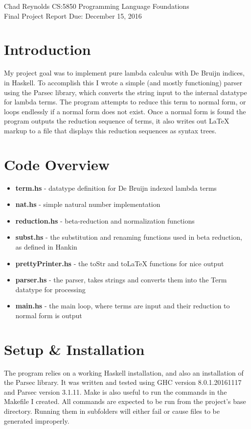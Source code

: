 \documentclass[12pt,oneside]{article}
\begin{document}
Chad Reynolds \hfill 
CS:5850 Programming Language Foundations \\ 
Final Project Report \hfill 
Due:  December 15, 2016 \\


\section*{Introduction} 
My project goal was to implement pure lambda calculus with De Bruijn indices, 
in Haskell.  To accomplish this I wrote a simple (and mostly functioning) 
parser using the Parsec library, which converts the string input to the 
internal datatype for lambda terms.  The program attempts to reduce this 
term to normal form, or loops endlessly if a normal form does not exist.  
Once a normal form is found the program outputs the reduction sequence of terms, 
it also writes out \LaTeX{} markup to a file that displays 
this reduction sequences as syntax trees.

\section*{Code Overview}
\begin{itemize}
\item \textbf{term.hs} - 
    datatype definition for De Bruijn indexed lambda terms
\item \textbf{nat.hs} - 
    simple natural number implementation
\item \textbf{reduction.hs} - 
    beta-reduction and normalization functions
\item \textbf{subst.hs} - 
    the substitution and renaming functions used in beta reduction, as 
    defined in Hankin \cite{hankin2004introduction}
\item \textbf{prettyPrinter.hs} - 
    the toStr and toLaTeX functions for nice output
\item \textbf{parser.hs} - 
    the parser, takes strings and converts them into the Term datatype for processing
\item \textbf{main.hs} - 
    the main loop, where terms are input and their reduction to normal form 
    is output
\end{itemize}

\section*{Setup \& Installation} 
The program relies on a working Haskell installation, and also an 
installation of the Parsec library.  It was written and tested using 
GHC version 8.0.1.20161117 and Parsec version 3.1.11.  Make is also useful 
to run the commands in the Makefile I created.  All commands are expected to 
be run from the project's base directory.  Running them in subfolders will 
either fail or cause files to be generated improperly. \\
\end{document}
